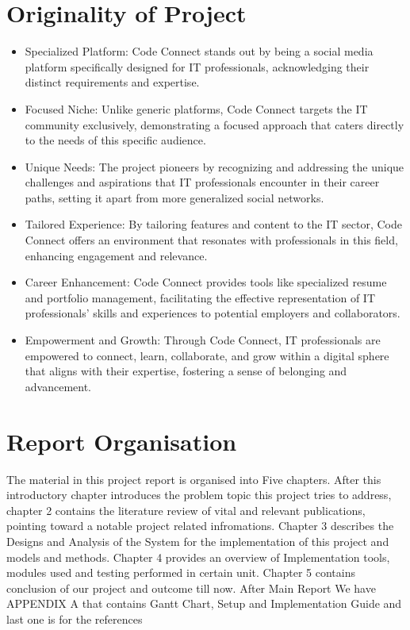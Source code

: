 \section{Originality of Project}

\begin{itemize}
    \item Specialized Platform: Code Connect stands out by being a social media platform specifically designed for IT professionals, acknowledging their distinct requirements and expertise.
    \item Focused Niche: Unlike generic platforms, Code Connect targets the IT community exclusively, demonstrating a focused approach that caters directly to the needs of this specific audience.
    \item Unique Needs: The project pioneers by recognizing and addressing the unique challenges and aspirations that IT professionals encounter in their career paths, setting it apart from more generalized social networks.
    \item Tailored Experience: By tailoring features and content to the IT sector, Code Connect offers an environment that resonates with professionals in this field, enhancing engagement and relevance.
    \item Career Enhancement: Code Connect provides tools like specialized resume and portfolio management, facilitating the effective representation of IT professionals' skills and experiences to potential employers and collaborators.

    \item Empowerment and Growth: Through Code Connect, IT professionals are empowered to connect, learn, collaborate, and grow within a digital sphere that aligns with their expertise, fostering a sense of belonging and advancement.
    
  \end{itemize}

\section{Report Organisation}
The material in this project report is organised into Five chapters. After this introductory chapter introduces the problem topic this project tries to address, chapter 2 contains the literature review of vital and relevant publications, pointing toward a notable project related infromations. Chapter 3 describes the Designs and Analysis of the System for the implementation of this project and models and methods. Chapter 4 provides an overview of Implementation tools, modules used and testing performed in certain unit. Chapter 5 contains conclusion of our project and outcome till now. After Main Report We have APPENDIX A that contains Gantt Chart, Setup and Implementation Guide and last one is for the references